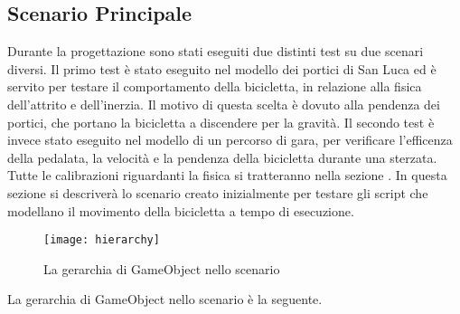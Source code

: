 \subsection{Scenario Principale}
Durante la progettazione sono stati eseguiti due distinti test su due scenari diversi. Il primo test è stato eseguito nel modello dei portici di San Luca ed è servito per testare il comportamento della bicicletta, in relazione alla fisica dell'attrito e dell'inerzia. Il motivo di questa scelta è dovuto alla pendenza dei portici, che portano la bicicletta a discendere per la gravità. Il secondo test è invece stato eseguito nel modello di un percorso di gara, per verificare l'efficenza della pedalata, la velocità e la pendenza della bicicletta durante una sterzata. Tutte le calibrazioni riguardanti la fisica si tratteranno nella sezione \textit{}. In questa sezione si descriverà lo scenario creato inizialmente per testare gli script che modellano il movimento della bicicletta a tempo di esecuzione.
 \begin{figure}[htb]
    \centering
    \texttt{[image: hierarchy]}
    \caption{La gerarchia di GameObject nello scenario\label{fig:hierarchy}}
\end{figure}
\noindent La gerarchia di GameObject nello scenario è la seguente.
